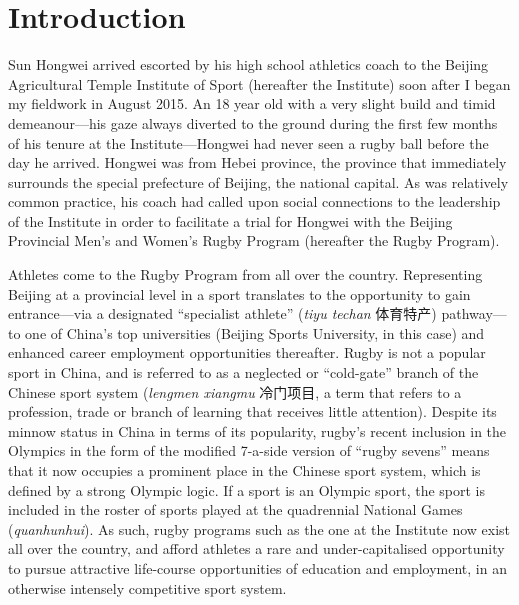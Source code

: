 

\chapter{\label{introduction}Introduction}

\minitoc
Sun Hongwei arrived escorted by his high school athletics coach to the Beijing Agricultural Temple Institute of Sport (hereafter the Institute) soon after I began my fieldwork in August 2015.  An 18 year old with a very slight build and timid demeanour---his gaze always diverted to the ground during the first few months of his tenure at the Institute---Hongwei had never seen a rugby ball before the day he arrived.
Hongwei was from Hebei province, the province that immediately surrounds the special prefecture of Beijing, the national capital.  As was relatively common practice, his coach had called upon social connections to the leadership of the Institute in order to facilitate a trial for Hongwei with the Beijing Provincial Men’s and Women's Rugby Program (hereafter the Rugby Program).

Athletes come to the Rugby Program from all over the country.  Representing Beijing at a provincial level in a sport translates to the opportunity to gain entrance---via a designated ``specialist athlete'' (\textit{tiyu techan} 体育特产) pathway---to one of China's top universities (Beijing Sports University, in this case) and enhanced career employment opportunities thereafter.  Rugby is not a popular sport in China, and is referred to as a neglected or ``cold-gate'' branch of the Chinese sport system (\textit{lengmen xiangmu} 冷门项目, a term that refers to a profession, trade or branch of learning that receives little attention). Despite its minnow status in China in terms of its popularity, rugby's recent inclusion in the Olympics in the form of the modified 7-a-side version of ``rugby sevens'' means that it now occupies a prominent place in the Chinese sport system, which is defined by a strong Olympic logic.  If a sport is an Olympic sport, the sport is included in the roster of sports played at the quadrennial National Games (\textit{quanhunhui}). As such, rugby programs such as the one at the Institute now exist all over the country, and afford athletes a rare and under-capitalised opportunity to pursue attractive life-course opportunities of education and employment, in an otherwise intensely competitive sport system.

